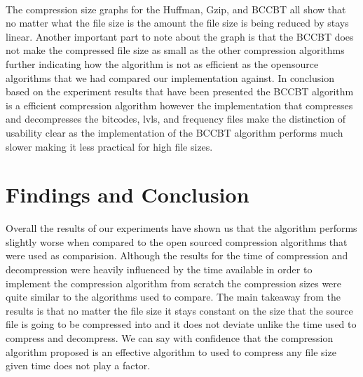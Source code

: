 \documentclass[12pt]{IEEEtran}
\begin{document}
\\
The compression size graphs for the Huffman, Gzip, and BCCBT all show that no matter
what the file size is the amount the file size is being reduced by stays linear.  Another
important part to note about the graph is that the BCCBT does not make the compressed file size
as small as the other compression algorithms further indicating how the algorithm is not as 
efficient as the opensource algorithms that we had compared our implementation against. In conclusion
based on the experiment results that have been presented the BCCBT algorithm is a efficient 
compression algorithm however the implementation that compresses and decompresses the bitcodes,
lvls, and frequency files make the distinction of usability clear as the implementation of the 
BCCBT algorithm performs much slower making it less practical for high file sizes.

\section{Findings and Conclusion}
Overall the results of our experiments have shown us that the algorithm performs slightly worse
when compared to the open sourced compression algorithms that were used as comparision.  Although 
the results for the time of compression and decompression were heavily influenced by the time available
in order to implement the compression algorithm from scratch the compression sizes were quite similar to 
the algorithms used to compare.  The main takeaway from the results is that no matter the file size 
it stays constant on the size that the source file is going to be compressed into and it does not deviate 
unlike the time used to compress and decompress.  We can say with confidence that the compression algorithm
proposed is an effective algorithm to used to compress any file size given time does not play a factor.
\end{document}
